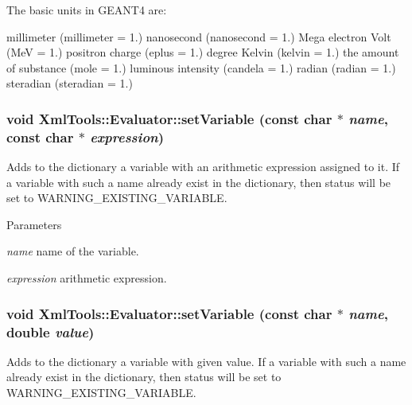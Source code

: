 The basic units in GEANT4 are: 
\begin{DoxyCode}
   millimeter              (millimeter = 1.)
   nanosecond              (nanosecond = 1.)
   Mega electron Volt      (MeV        = 1.)
   positron charge         (eplus      = 1.)
   degree Kelvin           (kelvin     = 1.)
   the amount of substance (mole       = 1.)
   luminous intensity      (candela    = 1.)
   radian                  (radian     = 1.)
   steradian               (steradian  = 1.)
\end{DoxyCode}
 \hypertarget{class_xml_tools_1_1_evaluator_aa585fa26afb0fbf64b60f9758a7de5f0}{
\subsubsection[{setVariable}]{\setlength{\rightskip}{0pt plus 5cm}void XmlTools::Evaluator::setVariable (const char $\ast$ {\em name}, \/  const char $\ast$ {\em expression})}}
\label{class_xml_tools_1_1_evaluator_aa585fa26afb0fbf64b60f9758a7de5f0}
Adds to the dictionary a variable with an arithmetic expression assigned to it. If a variable with such a name already exist in the dictionary, then status will be set to WARNING\_\-EXISTING\_\-VARIABLE.


\begin{DoxyParams}{Parameters}
\item[{\em name}]name of the variable. \item[{\em expression}]arithmetic expression. \end{DoxyParams}
\hypertarget{class_xml_tools_1_1_evaluator_a46b7fb4c5d1366cfa70a0b1faf1a8234}{
\subsubsection[{setVariable}]{\setlength{\rightskip}{0pt plus 5cm}void XmlTools::Evaluator::setVariable (const char $\ast$ {\em name}, \/  double {\em value})}}
\label{class_xml_tools_1_1_evaluator_a46b7fb4c5d1366cfa70a0b1faf1a8234}
Adds to the dictionary a variable with given value. If a variable with such a name already exist in the dictionary, then status will be set to WARNING\_\-EXISTING\_\-VARIABLE.


